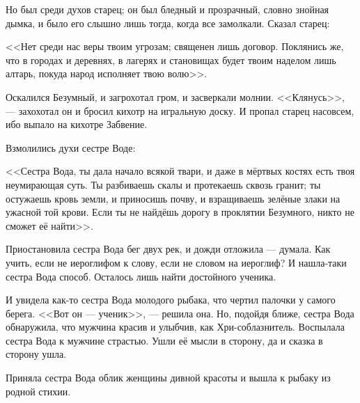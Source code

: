Но был среди духов старец;
он был бледный и прозрачный, словно знойная дымка, и было его слышно лишь тогда, когда все замолкали\FM.
Сказал старец:

<<Нет среди нас веры твоим угрозам;
священен лишь договор.
Поклянись же, что в городах и деревнях, в лагерях и становищах будет твоим наделом лишь алтарь, покуда народ исполняет твою волю>>.

Оскалился Безумный, и загрохотал гром, и засверкали молнии.
<<Клянусь>>, --- захохотал он и бросил кихотр на игральную доску.
И пропал старец насовсем, ибо выпало на кихотре Забвение.

Взмолились духи сестре Воде:

<<Сестра Вода, ты дала начало всякой твари, и даже в мёртвых костях есть твоя неумирающая суть.
Ты разбиваешь скалы и протекаешь сквозь гранит;
ты остужаешь кровь земли, и приносишь почву, и взращиваешь зелёные злаки на ужасной той крови.
Если ты не найдёшь дорогу в проклятии Безумного, никто не сможет её найти>>.

Приостановила сестра Вода бег двух рек\FM, и дожди отложила --- думала.
Как учить, если не иероглифом к слову, если не словом на иероглиф?
И нашла-таки сестра Вода способ.
Осталось лишь найти достойного ученика.

И увидела как-то сестра Вода молодого рыбака, что чертил палочки у самого берега.
<<Вот он --- ученик>>, --- решила она.
Но, подойдя ближе, сестра Вода обнаружила, что мужчина красив и улыбчив, как Хри-соблазнитель.
Воспылала сестра Вода к мужчине страстью.
Ушли её мысли в сторону, да и сказка в сторону ушла.

Приняла сестра Вода облик женщины дивной красоты и вышла к рыбаку из родной стихии.

